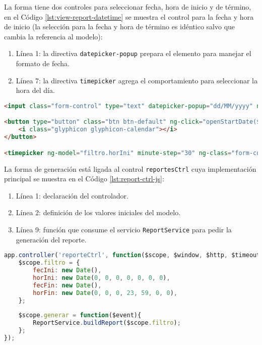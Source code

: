 La forma tiene dos controles para seleccionar fecha, hora de inicio y de término, en el Código \ref{lst:view-report-datetime} se muestra el control para la fecha y hora de inicio (la selección para la fecha y hora de término es idéntico salvo que cambia la referencia al modelo):
\begin{enumerate}
	\item Línea 1: la directiva \texttt{datepicker-popup} prepara el elemento para manejar el formato de fecha.
	\item Línea 7: la directiva \texttt{timepicker} agrega el comportamiento para seleccionar la hora del día.
\end{enumerate}
\begin{lstlisting}[language=HTML, captionpos=b, caption={Controles para seleccionar fecha y hora en la generación de reportes.}, label={lst:view-report-datetime}]
<input class="form-control" type="text" datepicker-popup="dd/MM/yyyy" ng-model="filtro.fecIni" is-open="startDateOpen" ng-required="true" starting-day="1" />

<button type="button" class="btn btn-default" ng-click="openStartDate($event)">
	<i class="glyphicon glyphicon-calendar"></i>
</button>

<timepicker ng-model="filtro.horIni" minute-step="30" ng-class="form-control"></timepicker>
\end{lstlisting}

La forma de generación está ligada al control \texttt{reportesCtrl} cuya implementación principal se muestra en el Código \ref{lst:report-ctrl-js}:

\begin{enumerate}
	\item Línea 1: declaración del controlador.
	\item Línea 2: definición de los valores iniciales del modelo.
	\item Línea 9: función que consume el servicio \texttt{ReportService} para pedir la generación del reporte.
\end{enumerate}

\begin{lstlisting}[language=Javascript, caption={Servicio en \textit{AngularJS} para pedir la generación de un reporte.}, captionpos=b, label={lst:report-ctrl-js}]
app.controller('reporteCtrl', function($scope, $window, $http, $timeout, ReportService){
	$scope.filtro = {
		fecIni: new Date(),
		horIni: new Date(0, 0, 0, 0, 0, 0, 0),
		fecFin: new Date(),
		horFin: new Date(0, 0, 0, 23, 59, 0, 0),
	};
	
	$scope.generar = function($event){
		ReportService.buildReport($scope.filtro);
	};
});
\end{lstlisting}

